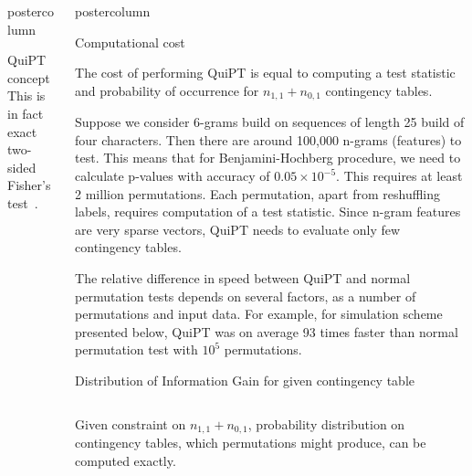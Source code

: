 \documentclass[final]{beamer}\usepackage[]{graphicx}\usepackage[]{color}
\newenvironment{knitrout}{}{} %
\newlength{\columnheight}
\begin{document}
\begin{frame}
\begin{columns}
\begin{column}{.47\textwidth}
\begin{beamercolorbox}[center,wd=\textwidth]{postercolumn}
\begin{minipage}[T]{.95\textwidth}
{\begin{block}{QuiPT concept}
This is in fact exact two-sided Fisher's test~\citep{lehmann1986testing}. 

\end{block}
\vfill 
    
    }
        \end{minipage}
      \end{beamercolorbox}
    \end{column}
    
    
    
    \begin{column}{.54\textwidth}
      \begin{beamercolorbox}[center,wd=\textwidth]{postercolumn}
        \begin{minipage}[T]{.95\textwidth}  
          \parbox[t][\columnheight]{\textwidth}
            {
     

 
\begin{block}{Computational cost}

The cost of performing QuiPT is equal to computing a test statistic and 
probability of occurrence for $n_{1,1} + n_{0,1}$ contingency tables.

Suppose we consider 6-grams build on sequences of length 25 build of four 
characters. Then there are around 100,000 n-grams (features) to test. 
This means that for Benjamini-Hochberg procedure, we need to calculate 
p-values with accuracy of $0.05 \times 10^{-5}$. This requires at least 
2 million permutations. Each permutation, apart from reshuffling labels, 
requires computation of a test statistic. Since n-gram features are very sparse vectors, QuiPT needs to evaluate only few contingency tables.

The relative difference in speed between QuiPT and normal permutation tests depends on several factors, as a number of permutations and input data. For example, for simulation scheme presented below, QuiPT was on average 93 times faster than normal permutation test with $10^5$ permutations.

\end{block}
\vfill 
    
\begin{block}{Distribution of Information Gain for given contingency table}

\begin{columns}
\centering
Given constraint on $n_{1,1} + n_{0,1}$, probability distribution on
contingency tables, which permutations might produce, 
can be computed exactly.
\scalebox{0.79}{
\begin{knitrout}
\definecolor{shadecolor}{rgb}{0.969, 0.969, 0.969}\color{fgcolor}


\end{knitrout}}
\end{columns}
\end{block}}
\end{minipage}
\end{beamercolorbox}
\end{column}
\end{columns}
\end{frame}
\end{document}
